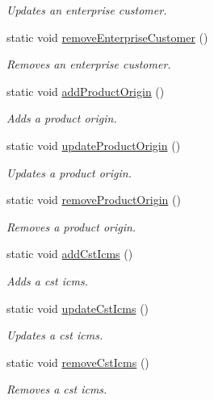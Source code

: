 \begin{DoxyCompactItemize}
\begin{DoxyCompactList}\small\item\em \-Updates an enterprise customer. \end{DoxyCompactList}\item 
static void \hyperlink{class_testing_a0a9bc945f6bcad7f890494122e6e560e}{remove\-Enterprise\-Customer} ()
\begin{DoxyCompactList}\small\item\em \-Removes an enterprise customer. \end{DoxyCompactList}\item 
static void \hyperlink{class_testing_a02d6f86ed7e930632a6cd3d014f4cc7f}{add\-Product\-Origin} ()
\begin{DoxyCompactList}\small\item\em \-Adds a product origin. \end{DoxyCompactList}\item 
static void \hyperlink{class_testing_ad37e15457da27b27ff75351255642d00}{update\-Product\-Origin} ()
\begin{DoxyCompactList}\small\item\em \-Updates a product origin. \end{DoxyCompactList}\item 
static void \hyperlink{class_testing_a99dee27b6799b453394fec77b36d9c9d}{remove\-Product\-Origin} ()
\begin{DoxyCompactList}\small\item\em \-Removes a product origin. \end{DoxyCompactList}\item 
static void \hyperlink{class_testing_a4aef0aafe824849ea27415b38e0d71c0}{add\-Cst\-Icms} ()
\begin{DoxyCompactList}\small\item\em \-Adds a cst icms. \end{DoxyCompactList}\item 
static void \hyperlink{class_testing_a2b83baf16e4d23ff6c5de2d5c1bab2fe}{update\-Cst\-Icms} ()
\begin{DoxyCompactList}\small\item\em \-Updates a cst icms. \end{DoxyCompactList}\item 
static void \hyperlink{class_testing_a55258e9ed301bb569fedc7f48400ff2c}{remove\-Cst\-Icms} ()
\begin{DoxyCompactList}\small\item\em \-Removes a cst icms. \end{DoxyCompactList}\end{DoxyCompactItemize}


